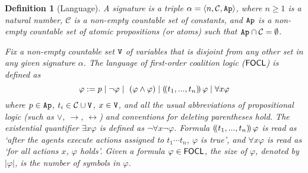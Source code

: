 \documentclass{article}
\newcommand\rustam[1]{\todo[color=blue!30,size=\small,inline]{Rustam: #1}}
\newtheorem{definition}{Definition}
\begin{document}
\label{sec:csl}
\begin{definition}[Language] 

A \emph{signature} is a triple $\alpha= \langle n,\mathcal{C},\texttt{Ap} \rangle$, where $n\geq 1$ is a natural number,  $\mathcal{C}$ is a non-empty  countable %
set of \emph{constants}, and $\texttt{Ap}$ is a non-empty countable set of \emph{atomic propositions} (or \emph{atoms}) %
such that $\texttt{Ap} \cap \mathcal{C} = \emptyset$.


Fix %
a non-empty countable set  $\texttt{V}$   %
of \emph{variables} that is disjoint from any other set in any given signature $\alpha$. 
The \emph{language of first-order coalition logic} ($\mathsf{FOCL}$) is defined as %
    \[\varphi := p \mid \neg \varphi \mid \ (\varphi \land \varphi) \mid (\!( t_1,..., t_n )\!)\, \varphi  \mid \forall x \varphi\]
where $p \in \texttt{Ap}$, $t_i \in \mathcal{C}\cup\texttt{V}$, $x \in \texttt{V}$, and all the usual abbreviations of propositional logic (such as $\vee$, $\to$, $\leftrightarrow$) and conventions for deleting parentheses hold. The existential quantifier $\exists x \varphi$ is defined as %
$\lnot \forall x \lnot \varphi$.
Formula $(\!( t_1,...,t_n )\!)\, \varphi$ is read as `after the agents execute actions assigned to $t_1\cdots t_n$, $\varphi$ is true', and $\forall x \varphi$ is read as `for all actions $x$, $\varphi$ holds'. Given a formula $\varphi \in \mathsf{FOCL}$, the \emph{size of} $\varphi$, denoted by $|\varphi|$, is the number of symbols in $\varphi$. 

\end{definition}


\end{document}
